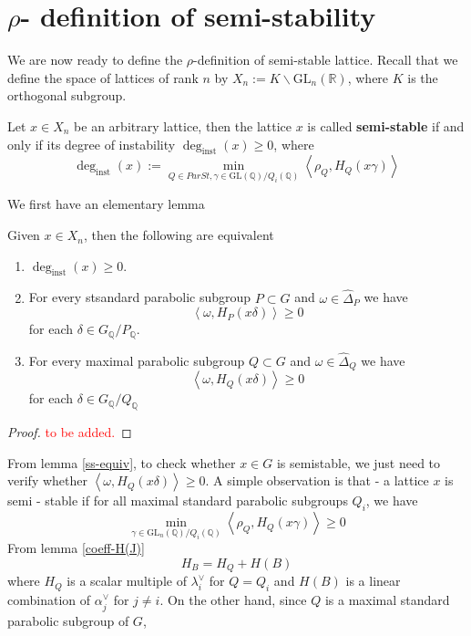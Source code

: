 \section{$\rho$- definition of semi-stability}
We are now ready to define the $\rho$-definition of semi-stable lattice. Recall that
we define the space of lattices of rank $n$ by $X_n := K \backslash \text{GL}_n(\mathbb{R})$, where $K$ is the orthogonal subgroup.
\begin{definition}[\label  = $\rho$-definition]\label{ss2}
    Let $x \in X_n$ be an arbitrary lattice, then the lattice $x$ is called \textbf{semi-stable} if and only if its degree of instability $\deg_{\text{inst}}(x)\ge 0$, where
    \[\deg_{\text{inst}}(x):= \min_{Q \in ParSt, \gamma \in \text{GL}(\mathbb{Q})/Q_i(\mathbb{Q})}\left\langle \rho_Q, H_Q(x\gamma) \right\rangle\]
\end{definition}
We first have an elementary lemma
\begin{lemma}\label{ss-equiv}
    Given $x \in X_n$, then the following are equivalent
    \begin{enumerate}
        \item $\deg_{\text{inst}}(x) \ge 0$.
        \item For every stsandard parabolic subgroup $P\subset G$ and $\omega \in \widehat{\Delta}_P$ we have \[\left\langle \omega,H_P(x\delta)\right\rangle \ge 0\] for each $\delta \in G_\mathbb{Q}/P_\mathbb{Q}$.
        \item For every maximal parabolic subgroup $Q\subset G$ and $\omega \in \widehat{\Delta}_Q$ we have \[\left\langle \omega,H_Q(x\delta)\right\rangle \ge 0\] for each $\delta \in G_\mathbb{Q}/Q_\mathbb{Q}$
    \end{enumerate}
\end{lemma}
\begin{proof}
    \textcolor{red}{to be added.}
\end{proof}
From lemma \ref{ss-equiv}, to check whether $x \in G$ is semistable, we just need to verify whether $\left\langle \omega,H_Q(x\delta)\right\rangle \ge 0$.
A simple observation is that - a lattice $x$ is semi - stable if for all maximal standard parabolic subgroups
$Q_i$, we have
\[\min_{\gamma \in \text{GL}_n(\mathbb{Q})/Q_i(\mathbb{Q})}\left\langle \rho_Q, H_Q(x\gamma) \right\rangle \ge 0\]
From lemma \ref{coeff-H(J)}
\[H_B = H_Q+H(B)\]
where $H_Q$ is a scalar multiple of $\lambda_i^\vee$ for $Q = Q_i$ and $H(B)$ is a linear combination of $\alpha_j^\vee$ for $ j \ne i$.
On the other hand, since $Q$ is a maximal standard parabolic subgroup of $G$, 
